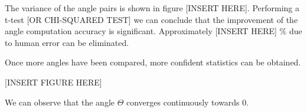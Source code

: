 The variance of the angle pairs is shown in figure [INSERT HERE]. Performing a t-test [OR CHI-SQUARED TEST] we can conclude that the improvement of the angle computation accuracy is significant. Approximately [INSERT HERE] \% due to human error can be eliminated.

Once more angles have been compared, more confident statistics can be obtained. 

[INSERT FIGURE HERE]

We can observe that the angle \( \Theta \) converges continuously towards 0.

